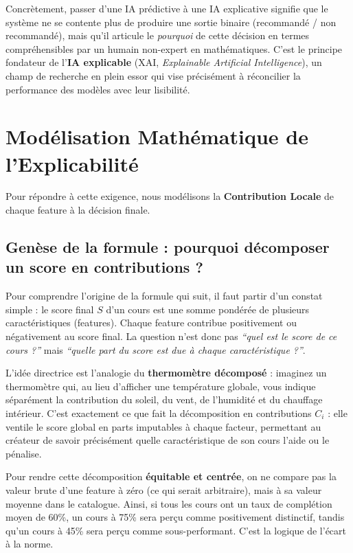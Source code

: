 \documentclass[11pt,a4paper]{article}
\begin{document}
Concrètement, passer d'une IA prédictive à une IA explicative signifie que le système ne se contente plus de produire une sortie binaire (recommandé / non recommandé), mais qu'il articule le \textit{pourquoi} de cette décision en termes compréhensibles par un humain non-expert en mathématiques. C'est le principe fondateur de l'\textbf{IA explicable} (XAI, \textit{Explainable Artificial Intelligence}), un champ de recherche en plein essor qui vise précisément à réconcilier la performance des modèles avec leur lisibilité.

\section{Modélisation Mathématique de l'Explicabilité}
Pour répondre à cette exigence, nous modélisons la \textbf{Contribution Locale} de chaque feature à la décision finale.

\subsection{Genèse de la formule : pourquoi décomposer un score en contributions ?}

Pour comprendre l'origine de la formule qui suit, il faut partir d'un constat simple : le score final $S$ d'un cours est une somme pondérée de plusieurs caractéristiques (features). Chaque feature contribue positivement ou négativement au score final. La question n'est donc pas \textit{``quel est le score de ce cours ?''} mais \textit{``quelle part du score est due à chaque caractéristique ?''}.

L'idée directrice est l'analogie du \textbf{thermomètre décomposé} : imaginez un thermomètre qui, au lieu d'afficher une température globale, vous indique séparément la contribution du soleil, du vent, de l'humidité et du chauffage intérieur. C'est exactement ce que fait la décomposition en contributions $C_i$ : elle ventile le score global en parts imputables à chaque facteur, permettant au créateur de savoir précisément quelle caractéristique de son cours l'aide ou le pénalise.

Pour rendre cette décomposition \textbf{équitable et centrée}, on ne compare pas la valeur brute d'une feature à zéro (ce qui serait arbitraire), mais à sa valeur moyenne dans le catalogue. Ainsi, si tous les cours ont un taux de complétion moyen de 60\%, un cours à 75\% sera perçu comme positivement distinctif, tandis qu'un cours à 45\% sera perçu comme sous-performant. C'est la logique de l'écart à la norme.
\end{document}
